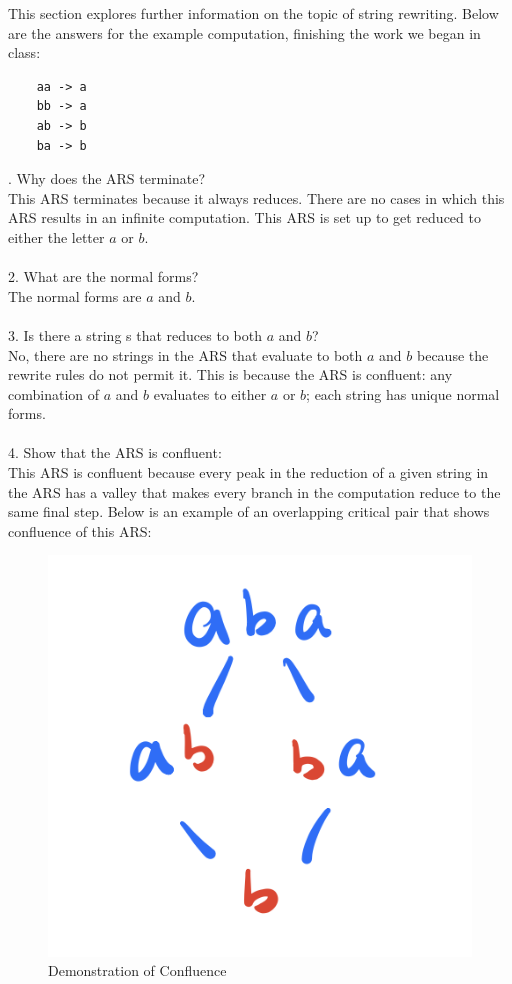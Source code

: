\documentclass{article}
\theoremstyle{theorem}
\theoremstyle{definition}
\theoremstyle{remark}
\begin{document}
This section explores further information on the topic of string rewriting. Below are the answers for the example computation, finishing the work we began in class:

\begin{lstlisting}
    aa -> a
    bb -> a
    ab -> b
    ba -> b
\end{lstlisting}

. Why does the ARS terminate?
\\\indent This ARS terminates because it always reduces. There are no cases in which this ARS results in an infinite computation. This ARS is set up to get reduced to either the letter $a$ or $b$. 
\\
\\
2. What are the normal forms?
\\\indent The normal forms are $a$ and $b$.
\\
\\
3. Is there a string s that reduces to both $a$ and $b$?
\\\indent No, there are no strings in the ARS that evaluate to both $a$ and $b$ because the rewrite rules do not permit it. This is because the ARS is confluent: any combination of $a$ and $b$ evaluates to either $a$ or $b$; each string has unique normal forms.
\\
\\
4. Show that the ARS is confluent:
\\\indent This ARS is confluent because every peak in the reduction of a given string in the ARS has a valley that makes every branch in the computation reduce to the same final step. Below is an example of an overlapping critical pair that shows confluence of this ARS: 
\begin{figure}[H]
\begin{center}
\includegraphics[scale=0.6]{img/ARSExample.png}
\end{center}
\caption{Demonstration of Confluence}\label{WS}
\end{figure}
\end{document}
